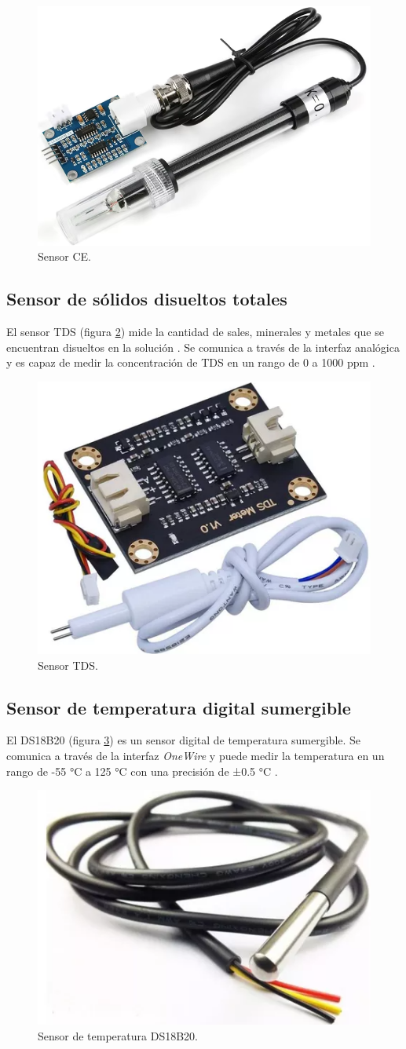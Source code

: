 \begin{figure}[H]
	\centering
	\includegraphics[height=.15\textwidth]{./Images/8.png}
	\caption{Sensor CE\protect\footnotemark.}
	\label{fig:CE}
\end{figure}


\subsection{Sensor de sólidos disueltos totales}

El sensor TDS (figura \ref{fig:TDS}) mide la cantidad de sales, minerales y
metales que se encuentran disueltos en la solución \cite{TDS-description}. Se
comunica a través de la interfaz analógica y es capaz de medir la concentración
de TDS en un rango de 0 a 1000 ppm \cite{TDS-Sensor}.

\begin{figure}[H]
	\centering
	\includegraphics[height=.15\textwidth]{./Images/9.png}
	\caption{Sensor TDS\protect\footnotemark.}
	\label{fig:TDS}
\end{figure}


\subsection{Sensor de temperatura digital sumergible}

El DS18B20 (figura \ref{fig:DS18B20}) es un sensor digital de temperatura
sumergible. Se comunica a través de la interfaz \textit{OneWire} y puede medir
la temperatura en un rango de -55 °C a 125 °C con una precisión de ±0.5 °C
\cite{DS18B20}.

\begin{figure}[H]
	\centering
	\includegraphics[height=.15\textwidth]{./Images/10.png}
	\caption{Sensor de temperatura DS18B20\protect\footnotemark.}
	\label{fig:DS18B20}
\end{figure}

